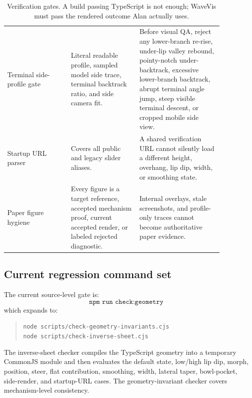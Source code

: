 \documentclass[12pt,letterpaper]{article}
\newcommand{\code}[1]{\texttt{#1}}
\begin{document}
\begin{table}[H]
{\begin{tabular}{Y{0.26\linewidth}Y{0.28\linewidth}Y{0.34\linewidth}}
Terminal side-profile gate & Literal readable profile, sampled model side trace, terminal backtrack ratio, and side camera fit. & Before visual QA, reject any lower-branch re-rise, under-lip valley rebound, pointy-notch under-backtrack, excessive lower-branch backtrack, abrupt terminal angle jump, steep visible terminal descent, or cropped mobile side view. \\
Startup URL parser & Covers all public and legacy slider aliases. & A shared verification URL cannot silently load a different height, overhang, lip dip, width, or smoothing state. \\
Paper figure hygiene & Every figure is a target reference, accepted mechanism proof, current accepted render, or labeled rejected diagnostic. & Internal overlays, stale screenshots, and profile-only traces cannot become authoritative paper evidence. \\
\bottomrule
\end{tabular}
}
\caption{Verification gates. A build passing TypeScript is not enough; WaveVis must pass the rendered outcome Alan actually uses.}
\end{table}

\subsection{Current regression command set}

The current source-level gate is:
\[
  \code{npm run check:geometry}
\]
which expands to:
\begin{quote}
\small
\code{node scripts/check-geometry-invariants.cjs}\\
\code{node scripts/check-inverse-sheet.cjs}
\end{quote}
The inverse-sheet checker compiles the TypeScript geometry into a temporary CommonJS module and then evaluates the default state, low/high lip dip, morph, position, steer, flat contribution, smoothing, width, lateral taper, bowl-pocket, side-render, and startup-URL cases. The geometry-invariant checker covers mechanism-level consistency.
\end{document}
